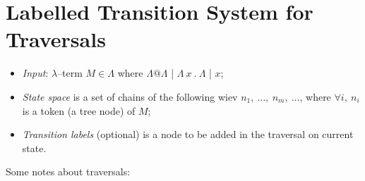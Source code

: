 \documentclass[a4paper, 10pt]{article}
\begin{document}
\section{Labelled Transition System for Traversals}
\begin{itemize}
\item \textit{Input}: $\lambda$--term $M \in \Lambda$ where $\Lambda @ \Lambda$ | $\Lambda\ x\ .\ \Lambda$ | $x$;
\item \textit{State space} is a set of chains of the following wiev $n_1,\ \dots,\ n_m,\ \dots$, where $\forall i,\ n_i$ is a token (a tree node) of $M$;
\item \textit{Transition labels} (optional) is a node to be added in the traversal on current state.
\end{itemize}

Some notes about traversals:
\end{document}
